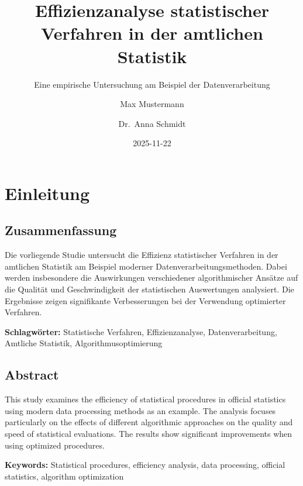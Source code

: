 \documentclass[
  ngerman,
  10pt,
  letterpaper,
]{book}
\title{Effizienzanalyse statistischer Verfahren in der amtlichen
Statistik}
\subtitle{Eine empirische Untersuchung am Beispiel der
Datenverarbeitung}
\author{Max Mustermann \and Dr.~Anna Schmidt}
\date{2025-11-22}
\renewcommand*\contentsname{Inhaltsverzeichnis}
\newcommand\contentsname{Inhaltsverzeichnis}
\begin{document}
\frontmatter
\maketitle

\renewcommand*\contentsname{Inhaltsverzeichnis}
{
\setcounter{tocdepth}{2}
\tableofcontents
}

\mainmatter
{}

\chapter*{Einleitung}\label{einleitung}


\section*{Zusammenfassung}\label{zusammenfassung}


Die vorliegende Studie untersucht die Effizienz statistischer Verfahren
in der amtlichen Statistik am Beispiel moderner
Datenverarbeitungsmethoden. Dabei werden insbesondere die Auswirkungen
verschiedener algorithmischer Ansätze auf die Qualität und
Geschwindigkeit der statistischen Auswertungen analysiert. Die
Ergebnisse zeigen signifikante Verbesserungen bei der Verwendung
optimierter Verfahren.

\textbf{Schlagwörter:} Statistische Verfahren, Effizienzanalyse,
Datenverarbeitung, Amtliche Statistik, Algorithmusoptimierung

\section*{Abstract}\label{abstract}


This study examines the efficiency of statistical procedures in official
statistics using modern data processing methods as an example. The
analysis focuses particularly on the effects of different algorithmic
approaches on the quality and speed of statistical evaluations. The
results show significant improvements when using optimized procedures.

\textbf{Keywords:} Statistical procedures, efficiency analysis, data
processing, official statistics, algorithm optimization
\end{document}
